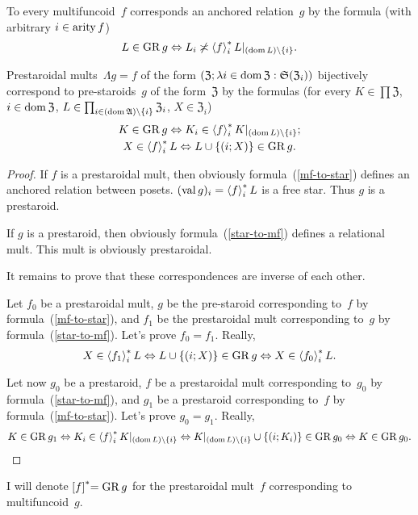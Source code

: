 \begin{defn}
To every multifuncoid~$f$ corresponds an anchored relation~$g$ by the
formula (with arbitrary $i\in\operatorname{arity} f$) 
\[
L\in\operatorname{GR} g\Leftrightarrow L_{i}\not\asymp\left\langle f\right\rangle ^{\ast}_{i}L|_{(\operatorname{dom} L)\setminus\{i\}}.
\]
\end{defn}
\begin{prop}
Prestaroidal mults~$\Lambda g=f$ of the form $(\mathfrak{Z};\lambda i\in\operatorname{dom}\mathfrak{Z}:\mathfrak{S}(\mathfrak{Z}_{i}))$
bijectively correspond to pre-staroids~$g$ of the form~$\mathfrak{Z}$
by the formulas (for every $K\in\prod\mathfrak{Z}$, $i\in\operatorname{dom}\mathfrak{Z}$,
$L\in\prod_{i\in(\operatorname{dom}\mathfrak{A})\setminus\{i\}}\mathfrak{Z}_{i}$,
$X\in\mathfrak{Z}_{i}$)
\begin{gather}
K\in\operatorname{GR} g\Leftrightarrow K_{i}\in\left\langle f\right\rangle ^{\ast}_{i}K|_{(\operatorname{dom} L)\setminus\{i\}};\label{mf-to-star}\\
X\in\left\langle f\right\rangle ^{\ast}_{i}L\Leftrightarrow L\cup\{(i;X)\}\in\operatorname{GR} g.\label{star-to-mf}
\end{gather}
\end{prop}
\begin{proof}
If $f$ is a prestaroidal mult, then obviously formula~(\ref{mf-to-star})
defines an anchored relation between posets. $(\operatorname{val} g)_{i}=\left\langle f\right\rangle ^{\ast}_{i}L$
is a free star. Thus $g$ is a prestaroid.

If $g$ is a prestaroid, then obviously formula~(\ref{star-to-mf})
defines a relational mult. This mult is obviously prestaroidal.

It remains to prove that these correspondences are inverse of each
other.

Let $f_{0}$ be a prestaroidal mult, $g$ be the pre-staroid corresponding
to~$f$ by formula~(\ref{mf-to-star}), and $f_{1}$ be the prestaroidal
mult corresponding to~$g$ by formula~(\ref{star-to-mf}). Let's
prove $f_{0}=f_{1}$. Really, 
\[
X\in\left\langle f_{1}\right\rangle ^{\ast}_{i}L\Leftrightarrow L\cup\{(i;X)\}\in\operatorname{GR} g\Leftrightarrow X\in\left\langle f_{0}\right\rangle ^{\ast}_{i}L.
\]


Let now $g_{0}$ be a prestaroid, $f$ be a prestaroidal mult corresponding
to~$g_{0}$ by formula~(\ref{star-to-mf}), and $g_{1}$ be a prestaroid
corresponding to~$f$ by formula~(\ref{mf-to-star}). Let's prove
$g_{0}=g_{1}$. Really, 
\[
K\in\operatorname{GR} g_{1}\Leftrightarrow K_{i}\in\left\langle f\right\rangle ^{\ast}_{i}K|_{(\operatorname{dom} L)\setminus\{i\}}\Leftrightarrow K|_{(\operatorname{dom} L)\setminus\{i\}}\cup\{(i;K_{i})\}\in\operatorname{GR} g_{0}\Leftrightarrow K\in\operatorname{GR} g_{0}.
\]
\end{proof}
\begin{defn}
I will denote $\mathrel{\left[f\right]^{\ast}}=\operatorname{GR} g$ for the prestaroidal mult~$f$ corresponding to multifuncoid~$g$.
\end{defn}

